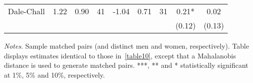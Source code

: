 \begin{table}[H]
\begin{threeparttable}
\begin{tabular}{p{3cm}S[table-format=3.3]@{}S[table-format=3.3]@{}S[table-format=3.2]@{}S[table-format=4.3]@{}S[table-format=3.3]@{}S[table-format=3.1]@{}S@{}S@{}}
            Dale-Chall                    &        1.22&        0.90&          41&       -1.04&        0.71&          31&        0.21*  &        0.02   \\
                                          &            &            &            &            &            &            &      (0.12)   &      (0.13)   \\
            \bottomrule
        \end{tabular}
        \begin{tablenotes}
            \tiny
            \item \textit{Notes}. Sample matched pairs (and distinct men and women, respectively). Table displays estimates identical to those in~\autoref{table10}, except that a Mahalanobis distance is used to generate matched pairs. ***, ** and * statistically significant at 1\%, 5\% and 10\%, respectively.
        \end{tablenotes}
    \end{threeparttable}
\end{table}